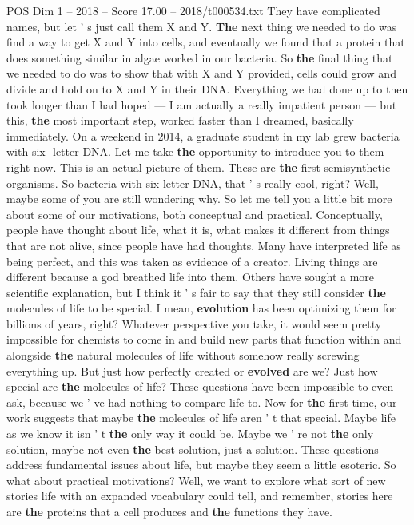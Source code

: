 \begin{textsample}{POS Dim 1 – 2018 – Score 17.00 – 2018/t000534.txt}
They have complicated names, but let ' s just call them X and Y. \textbf{The} next thing we needed to do was find a way to get X and Y into cells, and eventually we found that a protein that does something similar in algae worked in our bacteria.
So \textbf{the} final thing that we needed to do was to show that with X and Y provided, cells could grow and divide and hold on to X and Y in their DNA.
Everything we had done up to then took longer than I had hoped — I am actually a really impatient person — but this, \textbf{the} most important step, worked faster than I dreamed, basically immediately.
On a weekend in 2014, a graduate student in my lab grew bacteria with six- letter DNA.
Let me take \textbf{the} opportunity to introduce you to them right now.
This is an actual picture of them.
These are \textbf{the} first semisynthetic organisms.
So bacteria with six-letter DNA, that ' s really cool, right?
Well, maybe some of you are still wondering why.
So let me tell you a little bit more about some of our motivations, both conceptual and practical.
Conceptually, people have thought about life, what it is, what makes it different from things that are not alive, since people have had thoughts.
Many have interpreted life as being perfect, and this was taken as evidence of a creator.
Living things are different because a god breathed life into them.
Others have sought a more scientific explanation, but I think it ' s fair to say that they still consider \textbf{the} molecules of life to be special.
I mean, \textbf{evolution} has been optimizing them for billions of years, right?
Whatever perspective you take, it would seem pretty impossible for chemists to come in and build new parts that function within and alongside \textbf{the} natural molecules of life without somehow really screwing everything up.
But just how perfectly created or \textbf{evolved} are we?
Just how special are \textbf{the} molecules of life?
These questions have been impossible to even ask, because we ' ve had nothing to compare life to.
Now for \textbf{the} first time, our work suggests that maybe \textbf{the} molecules of life aren ' t that special.
Maybe life as we know it isn ' t \textbf{the} only way it could be.
Maybe we ' re not \textbf{the} only solution, maybe not even \textbf{the} best solution, just a solution.
These questions address fundamental issues about life, but maybe they seem a little esoteric.
So what about practical motivations?
Well, we want to explore what sort of new stories life with an expanded vocabulary could tell, and remember, stories here are \textbf{the} proteins that a cell produces and \textbf{the} functions they have.

\end{textsample}
